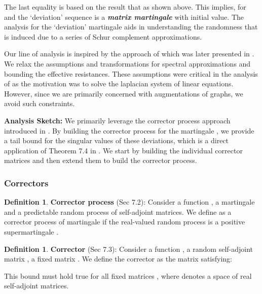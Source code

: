 \documentclass{article}
\theoremstyle{plain}
\theoremstyle{definition}
\newtheorem{definition}[theorem]{Definition}
\theoremstyle{remark}
\begin{document}
The last equality is based on the result that  as shown above. This implies,  for  and the `deviation' sequence  is a \textit{\textbf{matrix martingale}} with  initial value. The analysis for the `deviation' martingale  aids in understanding the randomness that is induced due to a series of Schur complement approximations.


Our line of analysis is inspired by the approach of \citet{kyng2016approximate} which was later presented in \citet{tropp2019matrix}. We relax the assumptions and transformations for spectral approximations and bounding the effective resistances. These assumptions were critical in the analysis of \citet{kyng2016approximate, tropp2019matrix} as the motivation was to solve the laplacian system of linear equations. However, since we are primarily concerned with augmentations of graphs, we avoid such constraints.

\textbf{Analysis Sketch:} We primarily leverage the corrector process approach introduced in \citet{tropp2019matrix}. By building the corrector process for the martingale , we provide a tail bound for the singular values of these deviations, which is a direct application of Theorem 7.4 in \citet{tropp2019matrix}. We start by building the individual corrector matrices and then extend them to build the corrector process.

\subsubsection{Correctors}

\begin{definition}
\textbf{Corrector process} \citep{tropp2019matrix}(Sec 7.2): Consider a function , a martingale  and a predictable random process  of self-adjoint matrices. We define  as a corrector process of martingale  if the real-valued random process  is a positive supermartingale \citep{williams1991probability, chow2003probability}. 
\end{definition}

\begin{definition}
\textbf{Corrector} \citep{tropp2019matrix}(Sec 7.3): Consider a function , a random self-adjoint matrix , a fixed matrix . We  define the corrector  as the matrix satisfying:



This bound must hold true for all fixed matrices , where  denotes a space of real  self-adjoint matrices.
\end{definition}
\end{document}
